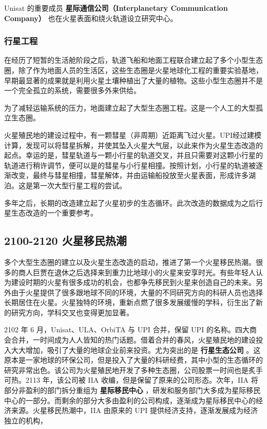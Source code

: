 \documentclass[letterpaper,10pt]{sphinxmanual}
\begin{document}
Unisat 的重要成员 \textbf{星际通信公司（Interplanetary Communication Company）} 也在火星表面和绕火轨道设立研究中心。
\begin{figure}[htbp]
\centering
\end{figure}


\subsubsection{行星工程}
\label{history:id29}
在经历了短暂的生活舱阶段之后，轨道飞船和地面工程联合建立起了多个小型生态圈，除了作为地面人员的生活区，这些生态圈是火星地球化工程的重要实验基地，早期最显著的成果就是利用火星土壤种植出了大量的植物。这些小型生态圈并不是一个完全孤立的系统，需要很多外来供给。

为了减轻运输系统的压力，地面建立起了大型生态圈工程。这是一个人工的大型孤立生态圈。

火星殖民地的建设过程中，有一颗彗星（非周期）近距离飞过火星。UPI经过建模计算，发现可以将彗星拆解，并使其坠入火星大气层，以此来作为火星生态改造的起点。幸运的是，彗星轨道与一颗小行星的轨道交叉，并且只需要对这颗小行星的轨道进行稍许调节，便可以是的彗星与小行星相撞。按照计划，小行星的轨道被逐渐改变，最终与彗星相撞，彗星解体，并由运输船投放至火星表面，形成许多湖泊。这是第一次大型行星工程的尝试。

多年之后，长期的改造建立起了火星初步的生态循环。此次改造的数据成为之后行星生态改造的一个重要参考。
\begin{figure}[htbp]
\centering
\end{figure}


\subsection{2100-2120 火星移民热潮}
\label{history:id30}
多个大型生态圈的建立以及火星生态改造的启动，推进了第一个火星移民热潮。很多的商人巨贾在退休之后选择来到重力比地球小的火星来安享时光。有些年轻人认为建设时期的火星有很多成功的机会，也都争先移民到火星来创造自己的未来。另外由于火星提供了很多跟地球不同的环境，大量的不同研究方向的科研人员也选择长期居住在火星。火星独特的环境，重新点燃了很多发展缓慢的学科，衍生出了新的研究方向，学科交叉也变得更加显著。

2102 年 6 月，Unisat、ULA、OrbiTA 与 UPI 合并，保留 UPI 的名称。四大商会合并，一时间成为人人皆知的热门话题。借着合并的春风，火星殖民地的建设投入大大增加，吸引了大量的地球企业前来投资。尤为突出的是 \textbf{行星生态公司} 。这原本是一家地球的环保公司，但是投入了大量的科研经费，其中小型的生态循环的研究非常出色。该公司为火星殖民地开发了多种生态圈，公司股票一时间也是炙手可热。2113 年，该公司被 IIA 收编，但是保留了原来的公司形态。次年，IIA 将部分非盈利的部门拆分重组为 \textbf{星际移民中心} ，研发和服务部门大多成为星际移民中心的一部分。而剩余的部分大多由盈利的公司构成，逐渐成为星际移民中心的经济来源。火星移民热潮中，IIA 由原来的 UPI 提供经济支持，逐渐发展成为经济独立的机构，
\end{document}
